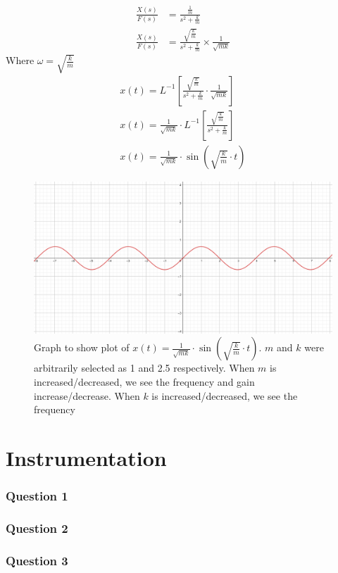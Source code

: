 \documentclass[12pt]{article}
\numberwithin{equation}{section}
\begin{document}
\begin{align}
  \frac{X(s)}{F(s)} &= \frac{\frac{1}{m}}{s^2 + \frac{k}{m}}\\
  \frac{X(s)}{F(s)} &= \frac{\sqrt{\frac{k}{m}}}{s^2 + \frac{k}{m}} \times \frac{1}{\sqrt{mk}}
\end{align}
Where $\omega = \sqrt{\frac{k}{m}}$
\begin{align}
  x(t) = L^{-1} \left[ \frac{\sqrt{\frac{k}{m}}}{s^2 + \frac{k}{m}} \cdot \frac{1}{\sqrt{mk}} \right]\\
  x(t) = \frac{1}{\sqrt{mk}} \cdot L^{-1} \left[ \frac{\sqrt{\frac{k}{m}}}{s^2 + \frac{k}{m}} \right]\\
  x(t) = \frac{1}{\sqrt{mk}} \cdot \sin{\left(\sqrt{\frac{k}{m}}\cdot t\right)}
\end{align}
\begin{figure}[H]
  \centering
  \includegraphics[width=\textwidth]{./img/2-5timeresponse.png}
  \caption{Graph to show plot of $x(t) = \frac{1}{\sqrt{mk}} \cdot \sin{\left(\sqrt{\frac{k}{m}}\cdot t\right)}$. $m$ and $k$ were arbitrarily selected as 1 and 2.5 respectively. When $m$ is increased/decreased, we see the frequency and gain increase/decrease. When $k$ is increased/decreased, we see the frequency }
\end{figure}
\part{Instrumentation}
\section{Question 1}
\section{Question 2}
\section{Question 3}
\end{document}

